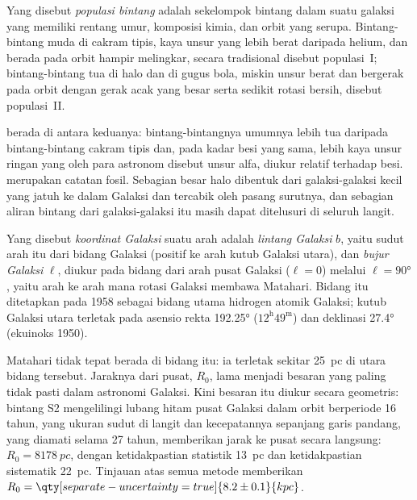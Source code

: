 \begin{definition}\label{def:b3:milky-way-galaxies:populations}
Yang disebut \emph{populasi bintang} adalah sekelompok bintang
dalam suatu galaksi yang memiliki rentang umur, komposisi kimia, dan
orbit yang serupa. Bintang-bintang muda di cakram tipis, kaya unsur yang lebih berat daripada
helium, dan berada pada orbit hampir melingkar, secara tradisional disebut
populasi~I; bintang-bintang tua di halo dan di gugus bola, miskin
unsur berat dan bergerak pada orbit dengan gerak acak yang besar serta sedikit
rotasi bersih, disebut populasi~II.
\end{definition}

 berada di antara keduanya: bintang-bintangnya umumnya lebih tua daripada
bintang-bintang cakram tipis dan, pada kadar besi yang sama, lebih kaya unsur ringan
yang oleh para astronom disebut unsur alfa, diukur relatif terhadap besi.  merupakan
catatan fosil. Sebagian besar halo dibentuk dari galaksi-galaksi kecil yang jatuh
ke dalam Galaksi dan tercabik oleh pasang surutnya, dan sebagian aliran
bintang dari galaksi-galaksi itu masih dapat ditelusuri di seluruh langit.

\begin{definition}\label{def:b3:milky-way-galaxies:coordinates}
Yang disebut \emph{koordinat Galaksi} suatu arah adalah
\emph{lintang Galaksi} $b$, yaitu sudut arah itu dari bidang Galaksi
(positif ke arah kutub Galaksi utara), dan \emph{bujur
Galaksi} $\ell$, diukur pada bidang dari arah
pusat Galaksi ($\ell = 0$) melalui $\ell = \ang{90}$, yaitu arah
ke arah mana rotasi Galaksi membawa Matahari. Bidang itu
ditetapkan pada 1958 sebagai bidang utama hidrogen atomik Galaksi;
kutub Galaksi utara terletak pada asensio rekta \ang{192.25}
($12^\mathrm{h}49^\mathrm{m}$) dan deklinasi \ang{27.4} (ekuinoks
1950).
\end{definition}

Matahari tidak tepat berada di bidang itu: ia terletak sekitar \qty{25}{pc} di utara bidang tersebut.
Jaraknya dari pusat, $R_0$, lama menjadi besaran yang paling tidak pasti dalam
astronomi Galaksi. Kini besaran itu diukur secara geometris: bintang S2 mengelilingi
lubang hitam pusat Galaksi dalam orbit berperiode \num{16} tahun, yang
ukuran sudut di langit dan kecepatannya sepanjang garis pandang, yang diamati
selama 27 tahun, memberikan jarak ke pusat secara langsung:
$R_0 = \qty{8178}{pc}$, dengan ketidakpastian statistik \qty{13}{pc} dan
ketidakpastian sistematik \qty{22}{pc}. Tinjauan atas semua metode memberikan
$R_0 = \qty[separate-uncertainty=true]{8.2 \pm 0.1}{kpc}$.

